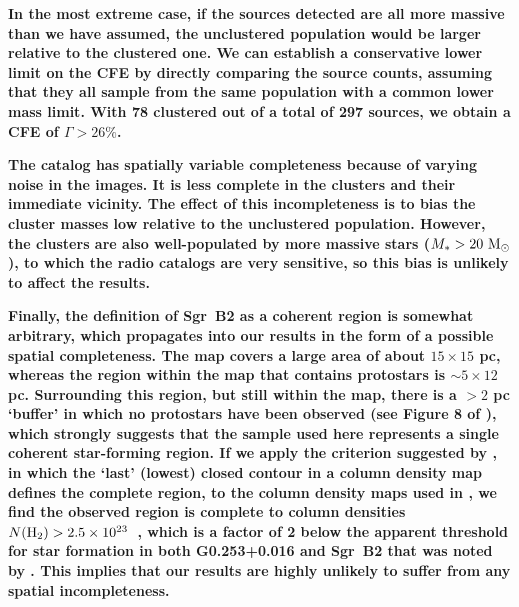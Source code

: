 \documentclass[twocolumn]{aastex62}
\def\referee#1{\textbf{#1}}
\begin{document}
\referee{
In the most extreme case, if the sources detected are all more massive than we
have assumed, the unclustered population would be larger relative to the clustered one.
We can establish a conservative lower limit on the CFE by directly comparing the
source counts, assuming that they all sample from the same population with a
common lower mass limit.  With 78 clustered out of a total of 297 sources, we
obtain a CFE of $\Gamma>26\%$.
}


\referee{
The catalog has spatially variable completeness because of varying noise in the
images.  It is less complete in the clusters and their immediate vicinity.  The
effect of this incompleteness is to bias the cluster masses low relative to the
unclustered population.  However, the clusters are also well-populated by more
massive stars ($M_*>20~\mathrm{M}_{\odot}$), to which the radio catalogs are very sensitive,
so this bias is unlikely to affect the results.
}

\referee{
Finally, the definition of Sgr~B2 as a coherent region is somewhat arbitrary,
which propagates into our results in the form of a possible spatial
completeness.  The \citet{Ginsburg2018a} map covers a large area of about
$15\times15$ pc, whereas the region within the map that contains protostars is
$\sim5\times12$ pc. Surrounding this region, but still within the map, there is
a $>2$ pc `buffer' in which no protostars have been observed (see Figure 8 of
\citealt{Ginsburg2018a}), which strongly suggests that the sample used here
represents a single coherent star-forming region. If we apply the criterion
suggested by \citet{Alves2017b}, in which the `last' (lowest) closed contour in
a column density map defines the complete region, to the column density maps
used in \citet{Ginsburg2018a}, we find the observed region is complete to
column densities $N(\textrm{H}_{2}) > 2.5\times10^{23}$~\persc, which is a factor of 2 below the
apparent threshold for star formation in both G0.253+0.016 and Sgr~B2 that was
noted by \citet{Ginsburg2018a}. This implies that our results are highly
unlikely to suffer from any spatial incompleteness.
}
\end{document}
